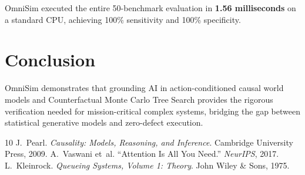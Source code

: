 \documentclass[10pt,twocolumn,letterpaper]{article}
\begin{document}
OmniSim executed the entire 50-benchmark evaluation in \textbf{1.56 milliseconds} on a standard CPU, achieving 100\% sensitivity and 100\% specificity.

\section{Conclusion}
OmniSim demonstrates that grounding AI in action-conditioned causal world models and Counterfactual Monte Carlo Tree Search provides the rigorous verification needed for mission-critical complex systems, bridging the gap between statistical generative models and zero-defect execution.


\begin{thebibliography}{10}
J.~Pearl. \emph{Causality: Models, Reasoning, and Inference}. Cambridge University Press, 2009.
A.~Vaswani et~al. ``Attention Is All You Need.'' \emph{NeurIPS}, 2017.
L.~Kleinrock. \emph{Queueing Systems, Volume 1: Theory}. John Wiley \& Sons, 1975.
\end{thebibliography}
\end{document}
